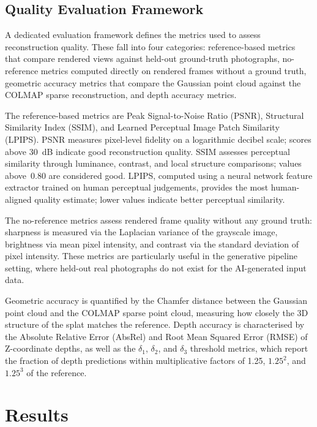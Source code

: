 \documentclass[conference]{IEEEtran}
\begin{document}
\subsection{Quality Evaluation Framework}

A dedicated evaluation framework defines the metrics used to assess reconstruction quality. These fall into four categories: reference-based metrics that compare rendered views against held-out ground-truth photographs, no-reference metrics computed directly on rendered frames without a ground truth, geometric accuracy metrics that compare the Gaussian point cloud against the COLMAP sparse reconstruction, and depth accuracy metrics.

The reference-based metrics are Peak Signal-to-Noise Ratio (PSNR), Structural Similarity Index (SSIM), and Learned Perceptual Image Patch Similarity (LPIPS). PSNR measures pixel-level fidelity on a logarithmic decibel scale; scores above 30~dB indicate good reconstruction quality. SSIM assesses perceptual similarity through luminance, contrast, and local structure comparisons; values above~0.80 are considered good. LPIPS, computed using a neural network feature extractor trained on human perceptual judgements, provides the most human-aligned quality estimate; lower values indicate better perceptual similarity.

The no-reference metrics assess rendered frame quality without any ground truth: sharpness is measured via the Laplacian variance of the grayscale image, brightness via mean pixel intensity, and contrast via the standard deviation of pixel intensity. These metrics are particularly useful in the generative pipeline setting, where held-out real photographs do not exist for the AI-generated input data.

Geometric accuracy is quantified by the Chamfer distance between the Gaussian point cloud and the COLMAP sparse point cloud, measuring how closely the 3D structure of the splat matches the reference. Depth accuracy is characterised by the Absolute Relative Error (AbsRel) and Root Mean Squared Error (RMSE) of Z-coordinate depths, as well as the $\delta_1$, $\delta_2$, and $\delta_3$ threshold metrics, which report the fraction of depth predictions within multiplicative factors of 1.25, $1.25^2$, and $1.25^3$ of the reference.

\section{Results}
\label{sec:results}
\end{document}

